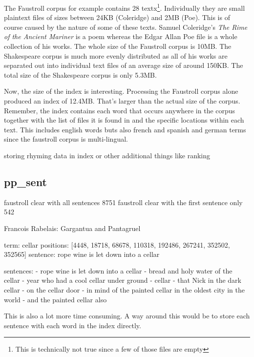 The Faustroll corpus for example contains 28 textx\footnote{This is technically not true since a few of those files are empty}. Individually they are small plaintext files of sizes between 24KB (Coleridge) and 2MB (Poe). This is of course caused by the nature of some of these texts. Samuel Coleridge's \textit{The Rime of the Ancient Mariner} is a poem whereas the Edgar Allan Poe file is a whole collection of his works. The whole size of the Faustroll corpus is 10MB. The Shakespeare corpus is much more evenly distributed as all of his works are separated out into individual text files of an average size of around 150KB. The total size of the Shakespeare corpus is only 5.3MB.

Now, the size of the index is interesting. Processing the Faustroll corpus alone produced an index of 12.4MB. That's larger than the actual size of the corpus. Remember, the index contains each word that occurs anywhere in the corpus together with the list of files it is found in and the specific locations within each text. This includes english words buts also french and spanish and german terms since the faustroll corpus is multi-lingual.

storing rhyming data in index or other additional things like ranking


\subsection{pp\_sent}

faustroll clear with all sentences 8751 
faustroll clear with the first sentence only 542

Francois Rabelais: Gargantua and Pantagruel

term: cellar
positions: [4448, 18718, 68678, 110318, 192486, 267241, 352502, 352565]
sentence: rope wine is let down into a cellar

sentences: 
  - rope wine is let down into a cellar
  - bread and holy water of the cellar
  - year who had a cool cellar under ground
  - cellar
  - that Nick in the dark cellar
  - on the cellar door
  - in mind of the painted cellar in the oldest city in the world
  - and the painted cellar also

\begin{draft}
  This is also a lot more time consuming.
  A way around this would be to store each sentence with each word in the index directly.
\end{draft}


